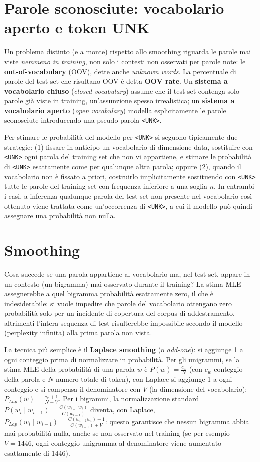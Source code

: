 \documentclass[11pt,a4paper]{report}
\begin{document}
\section{Parole sconosciute: vocabolario aperto e token UNK}

Un problema distinto (e a monte) rispetto allo smoothing riguarda le parole mai viste \emph{nemmeno in training}, non solo i contesti non osservati per parole note: le \textbf{out-of-vocabulary} (OOV), dette anche \emph{unknown words}. La percentuale di parole del test set che risultano OOV è detta \textbf{OOV rate}. Un \textbf{sistema a vocabolario chiuso} (\emph{closed vocabulary}) assume che il test set contenga solo parole già viste in training, un'assunzione spesso irrealistica; un \textbf{sistema a vocabolario aperto} (\emph{open vocabulary}) modella esplicitamente le parole sconosciute introducendo una pseudo-parola \texttt{<UNK>}.

Per stimare le probabilità del modello per \texttt{<UNK>} si seguono tipicamente due strategie: (1) fissare in anticipo un vocabolario di dimensione data, sostituire con \texttt{<UNK>} ogni parola del training set che non vi appartiene, e stimare le probabilità di \texttt{<UNK>} esattamente come per qualunque altra parola; oppure (2), quando il vocabolario non è fissato a priori, costruirlo implicitamente sostituendo con \texttt{<UNK>} tutte le parole del training set con frequenza inferiore a una soglia $n$. In entrambi i casi, a inferenza qualunque parola del test set non presente nel vocabolario così ottenuto viene trattata come un'occorrenza di \texttt{<UNK>}, a cui il modello può quindi assegnare una probabilità non nulla.

\section{Smoothing}

Cosa succede se una parola appartiene al vocabolario ma, nel test set, appare in un contesto (un bigramma) mai osservato durante il training? La stima MLE assegnerebbe a quel bigramma probabilità esattamente zero, il che è indesiderabile: si vuole impedire che parole del vocabolario ottengano zero probabilità solo per un incidente di copertura del corpus di addestramento, altrimenti l'intera sequenza di test risulterebbe impossibile secondo il modello (perplexity infinita) alla prima parola non vista.

La tecnica più semplice è il \textbf{Laplace smoothing} (o \emph{add-one}): si aggiunge 1 a ogni conteggio prima di normalizzare in probabilità. Per gli unigrammi, se la stima MLE della probabilità di una parola $w$ è $P(w) = \frac{c_w}{N}$ (con $c_w$ conteggio della parola e $N$ numero totale di token), con Laplace si aggiunge 1 a ogni conteggio e si compensa il denominatore con $V$ (la dimensione del vocabolario): $P_{Lap}(w) = \frac{c_w + 1}{N + V}$. Per i bigrammi, la normalizzazione standard $P(w_i \mid w_{i-1}) = \frac{C(w_{i-1}w_i)}{C(w_{i-1})}$ diventa, con Laplace, $P_{Lap}(w_i \mid w_{i-1}) = \frac{C(w_{i-1}w_i) + 1}{C(w_{i-1}) + V}$: questo garantisce che nessun bigramma abbia mai probabilità nulla, anche se non osservato nel training (se per esempio $V=1446$, ogni conteggio unigramma al denominatore viene aumentato esattamente di 1446).
\end{document}
